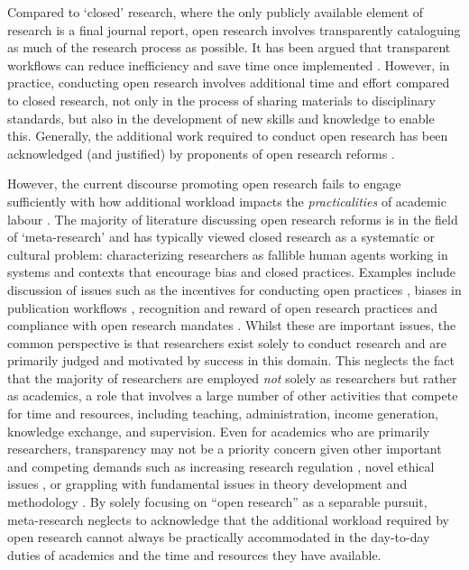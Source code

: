 \documentclass[ authordate, meta, issue]{jote-new-article}
\begin{document}
Compared to ‘closed’ research, where the only publicly available element of research is a final journal report, open research involves transparently cataloguing as much of the research process as possible. It has been argued that transparent workflows can reduce inefficiency and save time once implemented \parencites{Lowndes2017}. However, in practice, conducting open research involves additional time and effort compared to closed research, not only in the process of sharing materials to disciplinary standards, but also in the development of new skills and knowledge to enable this. Generally, the additional work required to conduct open research has been acknowledged (and justified) by proponents of open research reforms \parencites[e.g.][]{Allen2019}{Robson2021}{Scheliga2014}{Stewart2021}.



However, the current discourse promoting open research fails to engage sufficiently with how additional workload impacts the \emph{practicalities} of academic labour \parencites{Callard2022}. The majority of literature discussing open research reforms is in the field of ‘meta-research’ and has typically viewed closed research as a systematic or cultural problem: characterizing researchers as fallible human agents working in systems and contexts that encourage bias and closed practices. Examples include discussion of issues such as the incentives for conducting open practices \parencites{Nosek2012}, biases in publication workflows \parencites{Chambers2022}, recognition and reward of open research practices \parencites{Munafò2019} and compliance with open research mandates \parencites{Gabelica2022}. Whilst these are important issues, the common perspective is that researchers exist solely to conduct research and are primarily judged and motivated by success in this domain. This neglects the fact that the majority of researchers are employed \emph{not} solely as researchers but rather as academics, a role that involves a large number of other activities that compete for time and resources, including teaching, administration, income generation, knowledge exchange, and supervision. Even for academics who are primarily researchers, transparency may not be a priority concern given other important and competing demands such as increasing research regulation \parencites{Stewart2008}, novel ethical issues \parencites{Havard2012}, or grappling with fundamental issues in theory development \parencites{Eronen2021} and methodology \parencites{Uher2023}. By solely focusing on “open research” as a separable pursuit, meta-research neglects to acknowledge that the additional workload required by open research cannot always be practically accommodated in the day-to-day duties of academics and the time and resources they have available.
\end{document}
